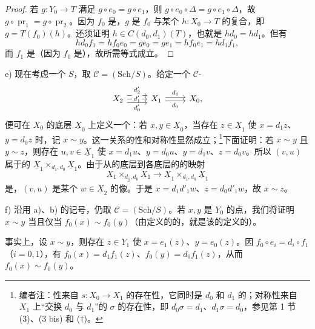 \begin{proof}
若 $g:Y_0\to T$ 满足 $g\circ e_0=g\circ e_1$，则 $g\circ e_0\circ\Delta=g\circ e_1\circ\Delta$，故 $g\circ\operatorname{pr}_1=g\circ\operatorname{pr}_2$。因为 $f_0$ 是，$g$ 是 $f_0$ 与某个 $h:X_0\to T$ 的复合，即 $g=T(f_0)(h)$。还须证明 $h\in C(d_0,d_1)(T)$，也就是 $hd_0=hd_1$。但有
\[hd_0f_1=hf_0e_0=ge_0=ge_1=hf_0e_1=hd_1f_1,\]
而 $f_1$ 是（因为 $f_0$ 是），故所需等式成立。
\end{proof}
e) 现在考虑一个 $S$，取 $\mathcal C=(\mathrm{Sch}/S)$。给定一个 $\mathcal C$-
\[
\begin{tikzcd}
X_2\arrow[r,shift left=1ex,"d'_2"]\arrow[r,"d'_1" description]\arrow[r,shift right=1ex,"d'_0"']&X_1\arrow[r,shift left=.5ex,"d_1"]\arrow[r,shift right=.5ex,"d_0"']&X_0,
\end{tikzcd}
\]
便可在 $X_0$ 的底层 $\underline X_0$ 上定义一个：若 $x,y\in\underline X_0$，当存在 $z\in\underline X_1$ 使 $x=d_1z$、$y=d_0z$ 时，记 $x\sim y$。这一关系的性和对称性显然成立；\footnote{编者注：性来自 $s:X_0\to X_1$ 的存在性，它同时是 $d_0$ 和 $d_1$ 的；对称性来自 $X_1$ 上“交换 $d_0$ 与 $d_1$”的 $\sigma$ 的存在性，即 $d_0\sigma=d_1$、$d_1\sigma=d_0$，参见第 1 节 (3)、(3 bis) 和 ($\dagger$)。}下面证明：若 $x\sim y$ 且 $y\sim z$，则存在 $u,v\in\underline X_1$ 使 $x=d_1u$、$y=d_0u$、$y=d_1v$、$z=d_0v$。所以 $(v,u)$ 属于的 $\underline X_1\times_{d_1,d_0}\underline X_1$。由于从的底层到各底层的的映射
\[\underline{X_1\times_{d_1,d_0}X_1}\longrightarrow\underline X_1\times_{d_1,d_0}\underline X_1\]
是，$(v,u)$ 是某个 $w\in\underline X_2$ 的像。于是 $x=d_1d'_1w$、$z=d_0d'_1w$，故 $x\sim z$。

f) 沿用 a)、b) 的记号，仍取 $\mathcal C=(\mathrm{Sch}/S)$。若 $x,y$ 是 $Y_0$ 的点，我们将证明 $x\sim y$ 当且仅当 $f_0(x)\sim f_0(y)$（由定义的的，就是该的定义的）。

事实上，设 $x\sim y$，则存在 $z\in Y_1$ 使 $x=e_1(z)$、$y=e_0(z)$。因 $f_0\circ e_i=d_i\circ f_1$（$i=0,1$），有 $f_0(x)=d_1f_1(z)$、$f_0(y)=d_0f_1(z)$，从而 $f_0(x)\sim f_0(y)$。

